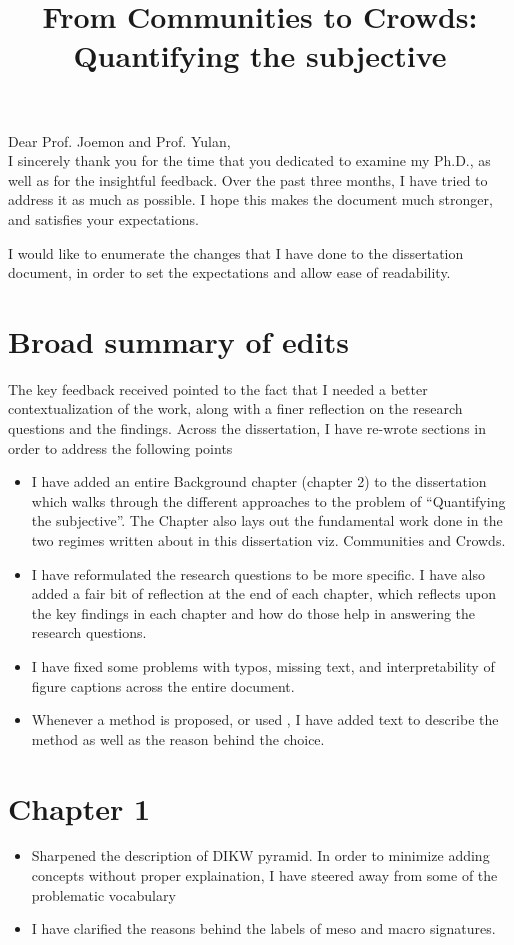 \documentclass[11pt,a4paper,roman]{moderncv}
\title{From Communities to Crowds: Quantifying the subjective}
\begin{document}
\maketitle

Dear Prof. Joemon and Prof. Yulan, \\


I sincerely thank you for the time that you dedicated to examine my Ph.D., as well as for the insightful feedback. Over the past three months, I have tried to address it as much as possible. 
I hope this makes the document much stronger, and satisfies your expectations.


I would like to enumerate the changes that I have done to the dissertation document, in order to set the expectations and allow ease of readability. 

\section{Broad summary of edits}
The key feedback received pointed to the fact that I needed a better contextualization of the work, along with a finer reflection on the research questions and the findings. Across the dissertation, I have re-wrote sections in order to address the following points 
\begin{itemize}
    \item I have added an entire Background chapter (chapter 2) to the dissertation which walks through the different approaches to the problem of ``Quantifying the subjective''. The Chapter also lays out the fundamental work done in the two regimes written about in this dissertation viz. Communities and Crowds. 
    \item I have reformulated the research questions to be more specific. I have also added a fair bit of reflection at the end of each chapter, which reflects upon the key findings in each chapter and how do those help in answering the research questions. 
    \item I have fixed some problems with typos, missing text, and interpretability of figure captions across the entire document. 
    \item Whenever a method is proposed, or used , I have added text to describe the method as well as the reason behind the choice. 
\end{itemize} 


\section{Chapter 1}
\begin{itemize}
    \item Sharpened the description of DIKW pyramid. In order to minimize adding concepts without proper explaination, I have steered away from some of the problematic vocabulary
    \item I have clarified the reasons behind the labels of meso and macro signatures.
\end{itemize}
\end{document}
